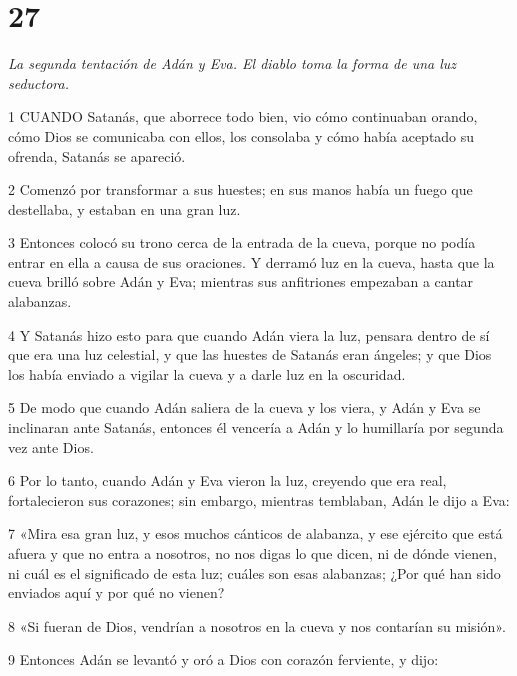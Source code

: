 \chapter{27}

\par \textit{La segunda tentación de Adán y Eva. El diablo toma la forma de una luz seductora.}

\par 1 CUANDO Satanás, que aborrece todo bien, vio cómo continuaban orando, cómo Dios se comunicaba con ellos, los consolaba y cómo había aceptado su ofrenda, Satanás se apareció.

\par 2 Comenzó por transformar a sus huestes; en sus manos había un fuego que destellaba, y estaban en una gran luz.

\par 3 Entonces colocó su trono cerca de la entrada de la cueva, porque no podía entrar en ella a causa de sus oraciones. Y derramó luz en la cueva, hasta que la cueva brilló sobre Adán y Eva; mientras sus anfitriones empezaban a cantar alabanzas.

\par 4 Y Satanás hizo esto para que cuando Adán viera la luz, pensara dentro de sí que era una luz celestial, y que las huestes de Satanás eran ángeles; y que Dios los había enviado a vigilar la cueva y a darle luz en la oscuridad.

\par 5 De modo que cuando Adán saliera de la cueva y los viera, y Adán y Eva se inclinaran ante Satanás, entonces él vencería a Adán y lo humillaría por segunda vez ante Dios.

\par 6 Por lo tanto, cuando Adán y Eva vieron la luz, creyendo que era real, fortalecieron sus corazones; sin embargo, mientras temblaban, Adán le dijo a Eva:

\par 7 «Mira esa gran luz, y esos muchos cánticos de alabanza, y ese ejército que está afuera y que no entra a nosotros, no nos digas lo que dicen, ni de dónde vienen, ni cuál es el significado de esta luz; cuáles son esas alabanzas; ¿Por qué han sido enviados aquí y por qué no vienen?

\par 8 «Si fueran de Dios, vendrían a nosotros en la cueva y nos contarían su misión».

\par 9 Entonces Adán se levantó y oró a Dios con corazón ferviente, y dijo:

